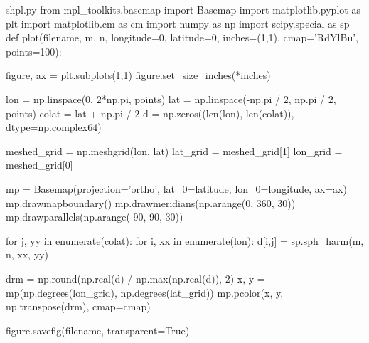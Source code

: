 \begin{filecontents*}{shpl.py}
from mpl_toolkits.basemap import Basemap
import matplotlib.pyplot as plt
import matplotlib.cm as cm
import numpy as np
import scipy.special as sp
def plot(filename, m, n, longitude=0, latitude=0, inches=(1,1), 
         cmap='RdYlBu', points=100):

    figure, ax = plt.subplots(1,1)
    figure.set_size_inches(*inches)

    lon = np.linspace(0, 2*np.pi, points)
    lat = np.linspace(-np.pi / 2, np.pi / 2, points)
    colat = lat + np.pi / 2
    d = np.zeros((len(lon), len(colat)), dtype=np.complex64)

    meshed_grid = np.meshgrid(lon, lat)
    lat_grid = meshed_grid[1]
    lon_grid = meshed_grid[0]

    mp = Basemap(projection='ortho', lat_0=latitude, lon_0=longitude, ax=ax)
    mp.drawmapboundary()
    mp.drawmeridians(np.arange(0, 360, 30))
    mp.drawparallels(np.arange(-90, 90, 30))

    for j, yy in enumerate(colat):
        for i, xx in enumerate(lon):
            d[i,j] = sp.sph_harm(m, n, xx, yy)

    drm = np.round(np.real(d) / np.max(np.real(d)), 2)
    x, y = mp(np.degrees(lon_grid), np.degrees(lat_grid))
    mp.pcolor(x, y, np.transpose(drm), cmap=cmap)

    figure.savefig(filename, transparent=True)
\end{filecontents*}

\newif\ifshpoverwrite
{}
\def\sphericalharmonicplot#1{%
  \tikzset{spherical harmonics/.cd,#1}%
  \edef\pythoncommand{python -c "import shpl; 
    shpl.plot('\shpfilename', \shpm, \shpn,
              latitude=\shplatitude, longitude=\shplongitude,
              cmap='\shpcmap', points=\shppoints, inches=\shpinches)"}%
  \ifshpoverwrite
    \immediate\write18{\pythoncommand}%
  \else
    \IfFileExists{\shpfilename}{}{\immediate\write18{\pythoncommand}}%
  \fi%
  \texttt{[image: \\shpfilename]}%
}


